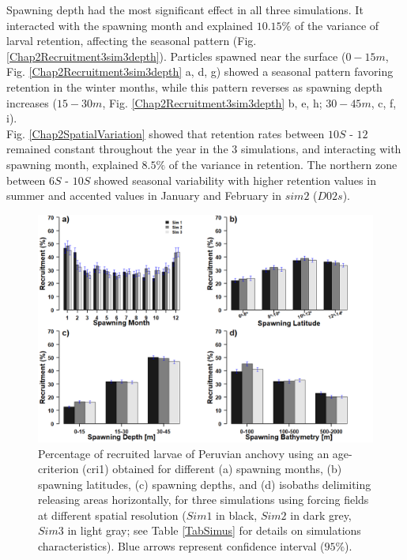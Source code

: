 Spawning depth had the most significant effect in all three simulations. It interacted with the spawning month and explained $10.15 \%$ of the variance of larval retention, affecting the seasonal pattern (Fig. \ref{Chap2Recruitment3sim3depth}). Particles spawned near the surface ($0-15 m$, Fig. \ref{Chap2Recruitment3sim3depth} a, d, g) showed a seasonal pattern favoring retention in the winter months, while this pattern reverses as spawning depth increases ($15 - 30 m$, Fig. \ref{Chap2Recruitment3sim3depth} b, e, h; $30 - 45 m$, c, f, i).\\

Fig. \ref{Chap2SpatialVariation} showed that retention rates between $10$\textdegree $S$ - $12$ remained constant throughout the year in the 3 simulations, and interacting with spawning month, explained $8.5\%$ of the variance in retention. The northern zone between $6$\textdegree $S$ - $10$\textdegree $S$ showed seasonal variability with higher retention values in summer and accented values in January and February in $sim 2$ ($D02s$).\\

\begin{figure}[H]
	\includegraphics[width=1.0\textwidth]{figures/Chap2Recruitment3bars.png}
	\centering
	\caption{Percentage of recruited larvae of Peruvian anchovy using an age-criterion (\gls{cri1}) obtained for different (a) spawning months, (b) spawning latitudes, (c) spawning depths, and (d) isobaths delimiting releasing areas horizontally, for three simulations using forcing fields at different spatial resolution ($Sim 1$ in black, $Sim 2$ in dark grey, $Sim 3$ in light gray; see Table \ref{TabSimus} for details on simulations characteristics). Blue arrows represent confidence interval ($95 \%$).}
	\label{Chap2Recruitment3bars}
\end{figure}

